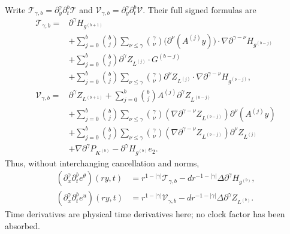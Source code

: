 Write $\mathcal T_{\gamma,b}=\partial_y^\gamma\partial_t^b\mathcal T$
and $\mathcal V_{\gamma,b}=\partial_y^\gamma\partial_t^b\mathcal V$.
Their full signed formulas are
\begin{align}
 \mathcal T_{\gamma,b}
 ={}&\partial^\gamma H_{g^{(b+1)}}\nonumber\\
 &+\sum_{j=0}^b\binom bj\sum_{\nu\leq\gamma}\binom\gamma\nu
   \bigl(\partial^\nu(A^{(j)}y)\bigr)\cdot
          \nabla\partial^{\gamma-\nu}H_{g^{(b-j)}}\nonumber\\
 &+\sum_{j=0}^b\binom bj
       \partial^\gamma Z_{L^{(j)}}\cdot G^{(b-j)}\nonumber\\
 &+\sum_{j=0}^b\binom bj\sum_{\nu\leq\gamma}\binom\gamma\nu
       \partial^\nu Z_{L^{(j)}}\cdot
          \nabla\partial^{\gamma-\nu}H_{g^{(b-j)}},
 \label{ifs:scalar-jets}\\
 \mathcal V_{\gamma,b}
 ={}&\partial^\gamma Z_{L^{(b+1)}}
       +\sum_{j=0}^b\binom bj A^{(j)}
                            \partial^\gamma Z_{L^{(b-j)}}\nonumber\\
 &+\sum_{j=0}^b\binom bj\sum_{\nu\leq\gamma}\binom\gamma\nu
       (\nabla\partial^{\gamma-\nu} Z_{L^{(b-j)}})
                              \partial^\nu(A^{(j)}y)\nonumber\\
 &+\sum_{j=0}^b\binom bj\sum_{\nu\leq\gamma}\binom\gamma\nu
       (\nabla\partial^{\gamma-\nu} Z_{L^{(b-j)}})
                              \partial^\nu Z_{L^{(j)}}\nonumber\\
 &+\nabla\partial^\gamma P_{K^{(b)}}
       -\partial^\gamma H_{g^{(b)}}e_2.
 \label{ifs:vector-jets}
\end{align}
Thus, without interchanging cancellation and norms,
\begin{align}
 (\partial_x^\gamma\partial_t^b e^\theta)(ry,t)
 &=r^{1-|\gamma|}\mathcal T_{\gamma,b}
    -d r^{-1-|\gamma|}\Delta\partial^\gamma H_{g^{(b)}},
 \label{ifs:physical-scalar-jets}\\
 (\partial_x^\gamma\partial_t^b e^u)(ry,t)
 &=r^{1-|\gamma|}\mathcal V_{\gamma,b}
    -d r^{-1-|\gamma|}\Delta\partial^\gamma Z_{L^{(b)}}.
 \label{ifs:physical-vector-jets}
\end{align}
Time derivatives are physical time derivatives here; no clock
factor has been absorbed.

